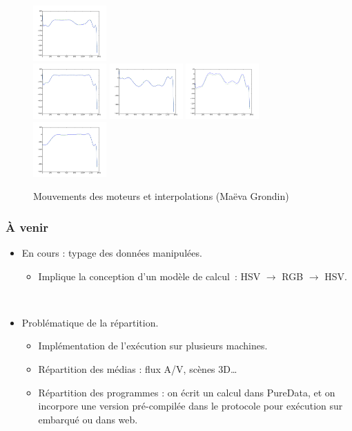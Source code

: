 \documentclass{beamer}
\begin{document}
\begin{frame}
\begin{figure}
		\includegraphics[width=0.25\textwidth]{images/graph/motor8.png}~\\
		\includegraphics[width=0.25\textwidth]{images/graph/motor9.png}
		\includegraphics[width=0.25\textwidth]{images/graph/motor10.png}
		\includegraphics[width=0.25\textwidth]{images/graph/motor11.png}
		\includegraphics[width=0.25\textwidth]{images/graph/motor12.png}
		\caption{Mouvements des moteurs et interpolations (Maëva Grondin)}
	\end{figure}
\end{frame}
\begin{frame}
	\frametitle{À venir}    
	\Large
	\begin{itemize}
		\item En cours : typage des données manipulées.
		\begin{itemize}
			\item Implique la conception d'un modèle de calcul~: HSV $\rightarrow$ RGB $\rightarrow$ HSV.
		\end{itemize}
		~\\
		\item Problématique de la répartition.
		\begin{itemize}
			\item Implémentation de l'exécution sur plusieurs machines.
			\item Répartition des médias : flux A/V, scènes 3D\dots
			\item Répartition des programmes : on écrit un calcul dans PureData, et on incorpore une version pré-compilée dans le protocole pour exécution sur embarqué ou dans web.
		\end{itemize}
		
	\end{itemize}
\end{frame}
\end{document}
